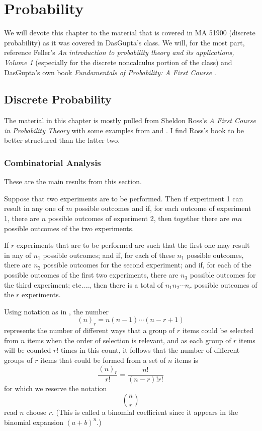 \chapter{Probability}
We will devote this chapter to the material that is covered in MA 51900
(discrete probability) as it was covered in DasGupta's class. We will, for
the most part, reference Feller's \emph{An introduction to probability
  theory and its applications, Volume 1} \cite{feller} (especially for the
discrete noncalculus portion of the class) and DasGupta's own book
\emph{Fundamentals of Probability: A First Course} \cite{dasgupta}.

\section{Discrete Probability}
The material in this chapter is mostly pulled from Sheldon Ross's \emph{A
  First Course in Probability Theory} \cite{ross} with some examples from
\cite{dasgupta} and \cite{feller}. I find Ross's book to be better
structured than the latter two.

\subsection{Combinatorial Analysis}
These are the main results from this section.
\begin{theorem}
  Suppose that two experiments are to be performed. Then if experiment 1
  can result in any one of \(m\) possible outcomes and if, for each outcome
  of experiment 1, there are \(n\) possible outcomes of experiment 2, then
  together there are \(mn\) possible outcomes of the two experiments.
\end{theorem}
\begin{theorem}
  If \(r\) experiments that are to be performed are such that the first one
  may result in any of \(n_1\) possible outcomes; and if, for each of these
  \(n_1\) possible outcomes, there are \(n_2\) possible outcomes for the
  second experiment; and if, for each of the possible outcomes of the first
  two experiments, there are \(n_3\) possible outcomes for the third
  experiment; etc.\@ ..., then there is a total of \(n_1n_2\dotsm n_r\)
  possible outcomes of the \(r\) experiments.
\end{theorem}

Using notation as in \cite{feller}, the number
\[
  (n)_r=n(n-1)\dotsm(n-r+1)
\]
represents the number of different ways that a group of \(r\) items could
be selected from \(n\) items when the order of selection is relevant, and
as each group of \(r\) items will be counted \(r!\) times in this count, it
follows that the number of different groups of \(r\) items that could be
formed from a set of \(n\) items is
\[
  \frac{(n)_r}{r!}=\frac{n!}{(n-r)!r!}
\]
for which we reserve the notation
\[
  \binom{n}{r}
\]
read \(n\) choose \(r\). (This is called a binomial coefficient since it
appears in the binomial expansion \((a+b)^n\).)

